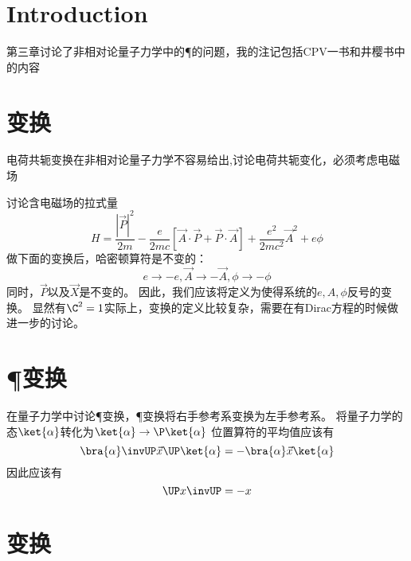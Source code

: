 \section{Introduction}
第三章讨论了非相对论量子力学中的\C \P \T 的问题，我的注记包括CPV一书和井樱书中的内容
\section{\C 变换}
电荷共轭变换在非相对论量子力学不容易给出,讨论电荷共轭变化，必须考虑电磁场

讨论含电磁场的拉式量
\begin{equation}
H = \frac{|\vec P|^2}{2m} - \frac e{2mc}[\vec A \cdot \vec P + \vec P \cdot \vec A] + \frac{e^2}{2mc^2}\vec A^2 + e\phi
\end{equation}
做下面的变换后，哈密顿算符是不变的：
\begin{equation}
    e\rightarrow-e, \vec A \rightarrow -\vec A, \phi\rightarrow -\phi
\end{equation}
同时，$\vec P$以及$\vec X$是不变的。
因此，我们应该将\C 定义为使得系统的$e,A,\phi$反号的变换。
显然有$\C^2 = 1$实际上，\C 变换的定义比较复杂，需要在有Dirac方程的时候做进一步的讨论。
\section{\P 变换}
在量子力学中讨论\P 变换，\P 变换将右手参考系变换为左手参考系。
将量子力学的态$\ket{\alpha}$转化为$\ket{\alpha}\rightarrow\P\ket{\alpha}$
位置算符的平均值应该有
\begin{equation}
    \bra{\alpha}\invUP\vec x \UP\ket{\alpha} = - \bra{\alpha}\vec x\ket{\alpha}
\end{equation}
因此应该有
\begin{equation}
    \UP x\invUP = -x
\end{equation}
\section{\T 变换}

